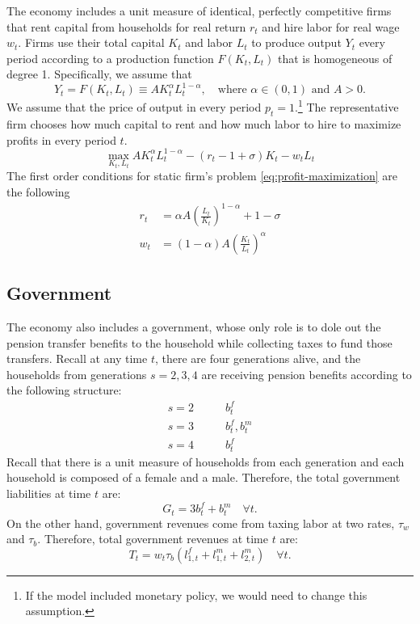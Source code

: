 \documentclass[BufferStockTheory]{subfiles}
\begin{document}
The economy includes a unit measure of identical, perfectly competitive firms that rent capital from households for real return $r_t$ and hire labor for real wage $w_t$. Firms use their total capital $K_t$ and labor $L_t$ to produce output $Y_t$ every period according to a production function $F(K_t,L_t)$ that is homogeneous of degree 1. Specifically, we assume that 
\begin{equation}
	\label{eq:production}
		Y_t=F(K_t,L_t)\equiv A K_t^\alpha L_t^{1-\alpha},\quad\text{where $\alpha\in(0,1)$ and $A>0$.}
\end{equation}
We assume that the price of output in every period $p_t=1.$\footnote{If the model included monetary policy, we would need to change this assumption.} The representative firm chooses how much capital to rent and how much labor to hire to maximize profits in every period $t.$
\begin{equation}
	\label{eq:profit-maximization}
	\max_{K_t,L_t} AK_t^\alpha L_t^{1-\alpha}-(r_t-1+\sigma)K_t -w_tL_t
\end{equation}
The first order conditions for static firm's problem \eqref{eq:profit-maximization} are the following
\begin{subequations}
	\label{eq:foc-firms}
	\begin{align}
		r_t&=\alpha A \left(\frac{L_t}{K_t}\right)^{1-\alpha} +1 -\sigma \label{eq:capitalrate} \\
		w_t&=(1-\alpha)A\left(\frac{K_t }{L_t}\right)^\alpha \label{eq:wagerate}
	\end{align}
\end{subequations}

\subsection{Government}

The economy also includes a government, whose only role is to dole out the pension transfer benefits to the household while collecting taxes to fund those transfers. Recall at any time $t$, there are four generations alive, and the households from generations $s=2,3,4$ are receiving pension benefits according to the following structure:
\begin{equation*}
	\begin{aligned}
		s=2 &\qquad b_t^f\\
		s=3 &\qquad b_t^f, b_t^m \\
		s=4 &\qquad b_t^f
	\end{aligned}
\end{equation*}
Recall that there is a unit measure of households from each generation and each household is composed of a female and a male. Therefore, the total government liabilities at time $t$ are:
\begin{equation}
	\label{eq:liabilities-gov}
	G_t= 3b_t^f + b_t^m \quad \forall t.
\end{equation}
On the other hand, government revenues come from taxing labor at two rates, $\tau_w$ and $\tau_b$. Therefore, total government revenues at time $t$ are:
\begin{equation}
	\label{eq:revenues-gov}
	T_t=w_t\tau_b(l_{1,t}^f + l_{1,t}^m+l_{2,t}^m)\quad \forall t.
\end{equation}
\end{document}
